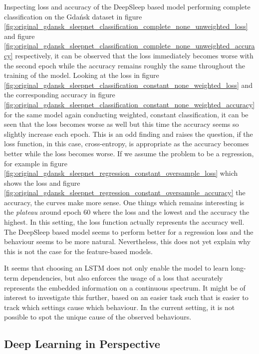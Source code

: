 \documentclass[11pt]{scrartcl}
\begin{document}
Inspecting loss and accuracy of the DeepSleep based model performing complete classification on the Gdańsk dataset in figure \ref{fig:original_gdansk_sleepnet_classification_complete_none_unweighted_loss} and figure \ref{fig:original_gdansk_sleepnet_classification_complete_none_unweighted_accuracy} respectively, it can be observed that the loss immediately becomes worse with the second epoch while the accuracy remains roughly the same throughout the training of the model. Looking at the loss in figure \ref{fig:original_gdansk_sleepnet_classification_constant_none_weighted_loss} and the corresponding accuracy in figure \ref{fig:original_gdansk_sleepnet_classification_constant_none_weighted_accuracy} for the same model again conducting weighted, constant classification, it can be seen that the loss becomes worse as well but this time the accuracy seems so slightly increase each epoch. This is an odd finding and raises the question, if the loss function, in this case, cross-entropy, is appropriate as the accuracy becomes better while the loss becomes worse. If we assume the problem to be a regression, for example in figure \ref{fig:original_gdansk_sleepnet_regression_constant_oversample_loss} which shows the loss and figure \ref{fig:original_gdansk_sleepnet_regression_constant_oversample_accuracy} the accuracy, the curves make more sense. One things which remains interesting is the \textit{plateau} around epoch 60 where the loss and the lowest and the accuracy the highest. In this setting, the loss function actually represents the accuracy well. The DeepSleep based model seems to perform better for a regression loss and the behaviour seems to be more natural. Nevertheless, this does not yet explain why this is not the case for the feature-based models.

It seems that choosing an LSTM does not only enable the model to learn long-term dependencies, but also enforces the usage of a loss that accurately represents the embedded information on a continuous spectrum. It might be of interest to investigate this further, based on an easier task such that is easier to track which settings cause which behaviour. In the current setting, it is not possible to spot the unique cause of the observed behaviours.

\subsection{Deep Learning in Perspective}
\end{document}

